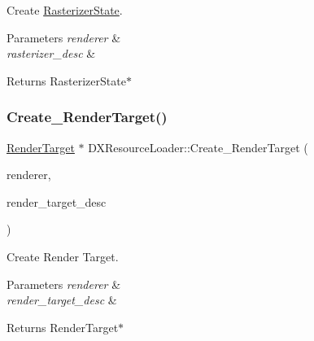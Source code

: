 Create \hyperlink{classRasterizerState}{Rasterizer\+State}. 


\begin{DoxyParams}{Parameters}
{\em renderer} & \\
\hline
{\em rasterizer\+\_\+desc} & \\
\hline
\end{DoxyParams}
\begin{DoxyReturn}{Returns}
Rasterizer\+State$\ast$ 
\end{DoxyReturn}
\mbox{\label{classDXResourceLoader_ae0466f57fe0391dd008e6810a27abf3e}} 
\subsubsection{\texorpdfstring{Create\+\_\+\+Render\+Target()}{Create\_RenderTarget()}}
{\footnotesize\ttfamily \hyperlink{classRenderTarget}{Render\+Target} $\ast$ D\+X\+Resource\+Loader\+::\+Create\+\_\+\+Render\+Target (\begin{DoxyParamCaption}\item[{\hyperlink{classDXRenderer}{D\+X\+Renderer} $\ast$}]{renderer,  }\item[{\hyperlink{structRenderTargetDesc}{Render\+Target\+Desc} \&}]{render\+\_\+target\+\_\+desc }\end{DoxyParamCaption})\hspace{0.3cm}{\ttfamily [static]}}



Create Render Target. 


\begin{DoxyParams}{Parameters}
{\em renderer} & \\
\hline
{\em render\+\_\+target\+\_\+desc} & \\
\hline
\end{DoxyParams}
\begin{DoxyReturn}{Returns}
Render\+Target$\ast$ 
\end{DoxyReturn}
\mbox{\label{classDXResourceLoader_aa1dac912b27e610a2c6a453c541bac02}} 
